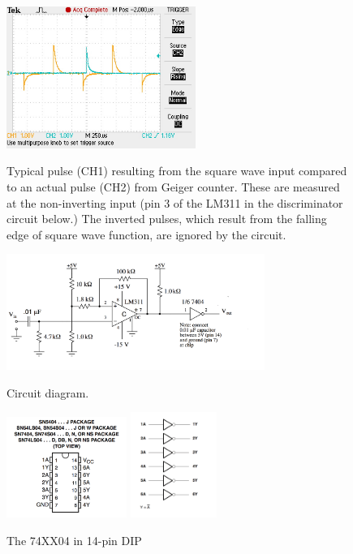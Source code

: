\documentclass[12pt]{article}
\begin{document}
\begin{figure}[htbp]
\begin{center}
{\includegraphics[width=0.55\textwidth]{figs/fake_pulse.jpg}}
\end{center}
\caption{\label{fig:fakepulse} Typical pulse (CH1) resulting from the square wave input compared to an actual pulse (CH2) from Geiger counter.
These are measured at the non-inverting input (pin 3 of the LM311 in the discriminator circuit below.)  The inverted pulses, which result from the falling edge of square wave function, are ignored by the circuit.}
\end{figure}

\begin{figure}[thbp]
\begin{center}
{\includegraphics[width=0.75\textwidth]{figs/discrim.pdf}}
\end{center}
\caption{\label{fig:filter} Circuit diagram.}
\end{figure}

\begin{figure}[thbp]
\begin{center}
{\includegraphics[width=0.35\textwidth]{figs/7404_pinout.png}}
{\includegraphics[width=0.25\textwidth]{figs/7404_scheme.png}}
\caption{\label{fig:7404} The 74XX04 in 14-pin DIP}
\end{center}
\end{figure}
\end{document}
